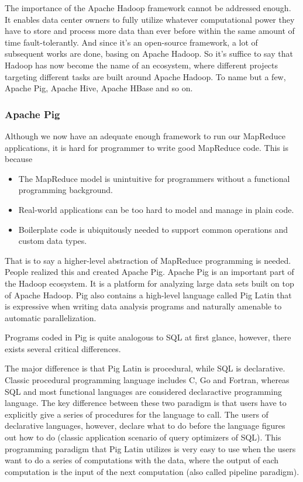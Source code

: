 \documentclass{article}
\begin{document}
The importance of the Apache Hadoop framework cannot be addressed enough. It enables data center owners to fully utilize whatever computational power they have to store and process more data than ever before within the same amount of time fault-tolerantly. And since it's an open-source framework, a lot of subsequent works are done, basing on Apache Hadoop. So it's suffice to say that Hadoop has now become the name of an ecosystem, where different projects targeting different tasks are built around Apache Hadoop. To name but a few, Apache Pig, Apache Hive, Apache HBase and so on.

\subsubsection{Apache Pig}

Although we now have an adequate enough framework to run our MapReduce applications, it is hard for programmer to write good MapReduce code. This is because\cite{mortar}
\begin{itemize}
\item The MapReduce model is unintuitive for programmers without a functional programming background.
\item Real-world applications can be too hard to model and manage in plain code.
\item Boilerplate code is ubiquitously needed to support common operations and custom data types.
\end{itemize}

That is to say a higher-level abstraction of MapReduce programming is needed. People realized this and created Apache Pig. Apache Pig is an important part of the Hadoop ecosystem. It is a platform for analyzing large data sets built on top of Apache Hadoop. Pig also contains a high-level language called Pig Latin that is expressive when writing data analysis programs and naturally amenable to automatic parallelization.

Programs coded in Pig is quite analogous to SQL at first glance, however, there exists several critical differences.

The major difference is that Pig Latin is procedural, while SQL is declarative. Classic procedural programming language includes C, Go and Fortran, whereas SQL and most functional languages are considered declaractive programming language. The key difference between these two paradigm is that users have to explicitly give a series of procedures for the language to call. The users of declarative languages, however, declare what to do before the language figures out how to do (classic application scenario of query optimizers of SQL). This programming paradigm that Pig Latin utilizes is very easy to use when the users want to do a series of computations with the data, where the output of each computation is the input of the next computation (also called pipeline paradigm\cite{wiki:pig}).
\end{document}
